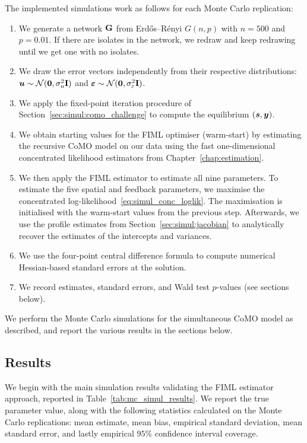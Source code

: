 The implemented simulations work as follows for each Monte Carlo replication:
\begin{enumerate}
    \item We generate a network $\mathbf{G}$ from Erd\H{o}s--R\'enyi $G(n,p)$ with $n = 500$ and $p = 0.01$. If there are isolates in the network, we redraw and keep redrawing until we get one with no isolates.
    \item We draw the error vectors independently from their respective distributions: $\bm{u} \sim \mathcal{N}(\bm{0}, \sigma_u^2\mathbf{I})$ and $\bm{\varepsilon} \sim \mathcal{N}(\bm{0}, \sigma_\varepsilon^2\mathbf{I})$.
    \item We apply the fixed-point iteration procedure of Section~\ref{sec:simul:como_challenge} to compute the equilibrium $(\bm{s}, \bm{y})$.
    \item We obtain starting values for the FIML optimiser (warm-start) by estimating the recursive CoMO model on our data using the fast one-dimensional concentrated likelihood estimators from Chapter~\ref{chap:estimation}.
    \item We then apply the FIML estimator to estimate all nine parameters. To estimate the five spatial and feedback parameters, we maximise the concentrated log-likelihood~\eqref{eq:simul_conc_loglik}. The maximisation is initialised with the warm-start values from the previous step. Afterwards, we use the profile estimates from Section~\ref{sec:simul:jacobian} to analytically recover the estimates of the intercepts and variances.
    \item We use the four-point central difference formula to compute numerical Hessian-based standard errors at the solution.
    \item We record estimates, standard errors, and Wald test $p$-values (see sections below).
\end{enumerate}

We perform the Monte Carlo simulations for the simultaneous CoMO model as described, and report the various results in the sections below.

\subsection{Results}
\label{sec:simul:mc_results}
We begin with the main simulation results validating the FIML estimator approach, reported in Table~\ref{tab:mc_simul_results}. We report the true parameter value, along with the following statistics calculated on the Monte Carlo replications: mean estimate, mean bias, empirical standard deviation, mean standard error, and lastly empirical $95\%$ confidence interval coverage.

